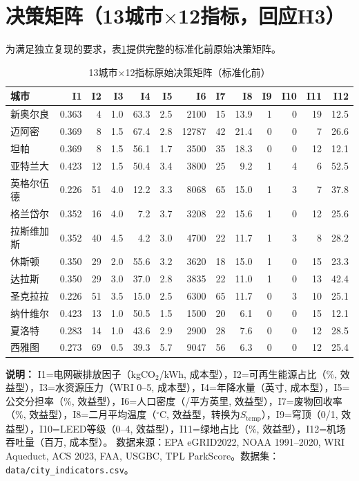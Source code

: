 \documentclass[12pt]{ctexart}
\begin{document}
\appendix

\section{决策矩阵（13城市$\times$12指标，回应H3）}

为满足独立复现的要求，表\ref{tab:decision_matrix}提供完整的标准化前原始决策矩阵。

\begin{table}[H]
\centering
\caption{13城市$\times$12指标原始决策矩阵（标准化前）}
\label{tab:decision_matrix}
\footnotesize
\begin{tabular}{lrrrrrrrrrrrr}
\toprule
\textbf{城市} & \textbf{I1} & \textbf{I2} & \textbf{I3} & \textbf{I4} & \textbf{I5} & \textbf{I6}
& \textbf{I7} & \textbf{I8} & \textbf{I9} & \textbf{I10} & \textbf{I11} & \textbf{I12} \\
\midrule
新奥尔良 & 0.363 & 4 & 1.0 & 63.3 & 2.5 & 2100 & 15 & 13.9 & 1 & 0 & 19 & 12.5 \\
迈阿密 & 0.369 & 8 & 1.5 & 67.4 & 2.8 & 12787 & 42 & 21.4 & 0 & 0 & 7 & 26.6 \\
坦帕 & 0.369 & 8 & 1.5 & 56.1 & 1.7 & 3500 & 35 & 18.3 & 0 & 0 & 12 & 12.1 \\
亚特兰大 & 0.423 & 12 & 1.5 & 50.4 & 3.4 & 3800 & 25 & 9.2 & 1 & 4 & 6 & 52.5 \\
英格尔伍德 & 0.226 & 51 & 4.0 & 12.2 & 3.3 & 8068 & 65 & 15.0 & 1 & 3 & 7 & 37.8 \\
格兰岱尔 & 0.352 & 16 & 4.0 & 7.2 & 3.7 & 3208 & 22 & 15.6 & 1 & 0 & 12 & 25.6 \\
拉斯维加斯 & 0.352 & 40 & 4.5 & 4.2 & 3.0 & 4700 & 22 & 11.7 & 1 & 3 & 8 & 28.2 \\
休斯顿 & 0.350 & 29 & 2.0 & 55.6 & 3.2 & 3620 & 18 & 15.0 & 1 & 0 & 15 & 23.3 \\
达拉斯 & 0.350 & 29 & 3.0 & 37.0 & 2.8 & 3835 & 22 & 11.0 & 1 & 0 & 13 & 42.4 \\
圣克拉拉 & 0.226 & 51 & 3.5 & 15.0 & 2.5 & 6300 & 65 & 11.7 & 0 & 3 & 10 & 25.1 \\
纳什维尔 & 0.423 & 13 & 1.0 & 50.5 & 1.5 & 1500 & 20 & 6.1 & 0 & 0 & 15 & 12.1 \\
夏洛特 & 0.283 & 14 & 1.0 & 43.6 & 2.9 & 2900 & 28 & 7.6 & 0 & 0 & 12 & 28.5 \\
西雅图 & 0.273 & 69 & 0.5 & 39.3 & 5.7 & 9047 & 56 & 6.3 & 0 & 0 & 12 & 25.4 \\
\bottomrule
\end{tabular}

\vspace{0.3em}
\scriptsize
\noindent\textbf{说明：} I1=电网碳排放因子（kgCO$_2$/kWh, 成本型），I2=可再生能源占比（\%, 效益型），I3=水资源压力（WRI 0--5, 成本型），I4=年降水量（英寸, 成本型），I5=公交分担率（\%, 效益型），I6=人口密度（/平方英里, 效益型），I7=废物回收率（\%, 效益型），I8=二月平均温度（$^\circ$C, 效益型，转换为$S_{\text{temp}}$），I9=穹顶（0/1, 效益型），I10=LEED等级（0--4, 效益型），I11=绿地占比（\%, 效益型），I12=机场吞吐量（百万, 成本型）。
数据来源：EPA eGRID2022, NOAA 1991--2020, WRI Aqueduct, ACS 2023, FAA, USGBC, TPL ParkScore。数据集：\texttt{data/city\_indicators.csv}。
\end{table}
\end{document}
